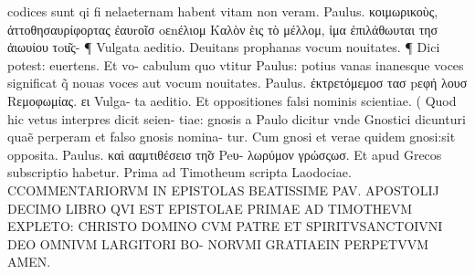 \documentclass{article}
\begin{document}
\begin{pages}
codices sunt qi fi nelaeternam habent vitam non veram. Paulus. κοιμωρικοὺς, ἀττοθησαυρίφορτας ἐαυrοῖσ oεnέλιομ Καλὸν ὲις τὸ μέλλομ, ἰμα ἐπιλάθωυται τησ ἀιωυίου τou͂ς- ¶ Vulgata aeditio. Deuitans prophanas vocum nouitates. ¶ Dici potest: euertens. Et vo- cabulum quo vtitur Paulus: potius vanas inanesque voces significat q̃ nouas voces aut vocum nouitates. Paulus. ἐκτρετόμεμοσ τασ pεφή λουσ Rεμοφωμίας. ει Vulga- ta aeditio. Et oppositiones falsi nominis scientiae. ( Quod hic vetus interpres dicit seien- tiae: gnosis a Paulo dicitur vnde Gnostici dicunturi quaẽ perperam et falso gnosis nomina- tur. Cum gnosi et verae quidem gnosi:sit opposita. Paulus. καὶ ααμτιθέσεισ τη̃σ Peυ- λωρύμον γρώσςωσ. Et apud Grecos subscriptio habetur. Prima ad Timotheum  scripta Laodociae.  \pend\pstart CCOMMENTARIORVM IN EPISTOLAS BEATISSIME PAV. APOSTOLIJ DECIMO LIBRO QVI EST EPISTOLAE PRIMAE AD TIMOTHEVM EXPLETO: CHRISTO DOMINO CVM PATRE ET SPIRITVSANCTOIVNI DEO OMNIVM LARGITORI BO- NORVMI GRATIAEIN PERPETVVM AMEN.  \pend
\endnumbering
\end{pages}
\end{document}
